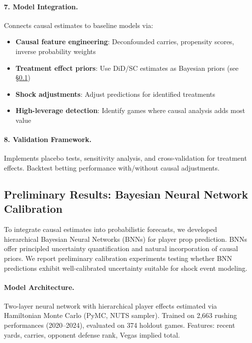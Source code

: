 

\paragraph{7. Model Integration.}
Connects causal estimates to baseline models via:
\begin{itemize}
  \item \textbf{Causal feature engineering}: Deconfounded carries, propensity scores, inverse probability weights
  \item \textbf{Treatment effect priors}: Use DiD/SC estimates as Bayesian priors (see \S\ref{subsec:bnn-calibration})
  \item \textbf{Shock adjustments}: Adjust predictions for identified treatments
  \item \textbf{High-leverage detection}: Identify games where causal analysis adds most value
\end{itemize}

\paragraph{8. Validation Framework.}
Implements placebo tests, sensitivity analysis, and cross-validation for treatment effects. Backtest betting performance with/without causal adjustments.

\subsection{Preliminary Results: Bayesian Neural Network Calibration}
\label{subsec:bnn-calibration}

To integrate causal estimates into probabilistic forecasts, we developed hierarchical Bayesian Neural Networks (BNNs) for player prop prediction. BNNs offer principled uncertainty quantification and natural incorporation of causal priors. We report preliminary calibration experiments testing whether BNN predictions exhibit well-calibrated uncertainty suitable for shock event modeling.

\paragraph{Model Architecture.}
Two-layer neural network with hierarchical player effects estimated via Hamiltonian Monte Carlo (PyMC, NUTS sampler). Trained on 2,663 rushing performances (2020--2024), evaluated on 374 holdout games. Features: recent yards, carries, opponent defense rank, Vegas implied total.

